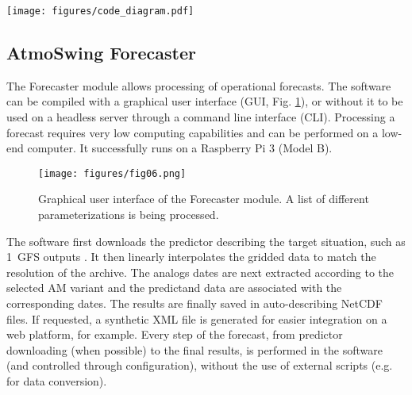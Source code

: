 \documentclass[review]{elsarticle}
\begin{document}
\begin{figure*}[hbt!]
	\texttt{[image: figures/code\_diagram.pdf]}
	\caption{Simplified illustration of the main classes or objects involved in the core of the AM processing in AtmoSwing. The processor class interacts with parent classes that can represent different entities, such as different reanalysis datasets, predictand, criteria, scores, and in different contexts: calibration, forecasting, and downscaling. The items in green are only available in the Optimizer, the ones in blue, in the Forecaster, and the ones in Orange, in the Downscaler. The area represents the spatial window and the time array a list of candidate dates (from preselection or previous analogy levels). The links to the parameters illustrate the dynamic definition of the different types by the parameters from the XML file.}
	\label{figure:code_diagram}
\end{figure*}


\subsection{AtmoSwing Forecaster}
\label{sec:forecaster}

The Forecaster module allows processing of operational forecasts. The software can be compiled with a graphical user interface (GUI, Fig. \ref{figure:atmoswing-forecaster-gui}), or without it to be used on a headless server through a command line interface (CLI). Processing a forecast requires very low computing capabilities and can be performed on a low-end computer. It successfully runs on a Raspberry Pi 3 (Model B).

\begin{figure}[hbt!]
	\texttt{[image: figures/fig06.png]}
	\caption{Graphical user interface of the Forecaster module. A list of different parameterizations is being processed.}
	\label{figure:atmoswing-forecaster-gui}
\end{figure}

The software first downloads the predictor describing the target situation, such as 1\degree\ GFS outputs \citep[Global Forecast System,][see Sect. \ref{sec:data}]{Kanamitsu1991,Kanamitsu1989}. It then linearly interpolates the gridded data to match the resolution of the archive. The analogs dates are next extracted according to the selected AM variant and the predictand data are associated with the corresponding dates. The results are finally saved in auto-describing NetCDF files. If requested, a synthetic XML file is generated for easier integration on a web platform, for example. Every step of the forecast, from predictor downloading (when possible) to the final results, is performed in the software (and controlled through configuration), without the use of external scripts (e.g. for data conversion).
\end{document}
